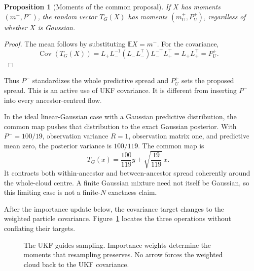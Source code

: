 \documentclass[11pt,a4paper]{article}
\newcommand{\E}{\mathbb E}
\newcommand{\Cov}{\operatorname{Cov}}
\newtheorem{proposition}{Proposition}[section]
\begin{document}
\begin{proposition}[Moments of the common proposal]
If \(X\) has moments \((m^-,P^-)\), the random vector \(T_G(X)\) has
moments \((m_U^+,P_U^+)\), regardless of whether \(X\) is Gaussian.
\end{proposition}
\begin{proof}
The mean follows by substituting \(\E X=m^-\). For the covariance,
\begin{equation}
\label{eq:global-covariance}
 \Cov(T_G(X))
 =L_+L_-^{-1}(L_-L_-^\top)L_-^{-\top}L_+^\top
 =L_+L_+^\top=P_U^+ .
\end{equation}
\end{proof}

Thus \(P^-\) standardizes the whole predictive spread and \(P_U^+\)
sets the proposed spread. This is an active use of UKF covariance.
It is different from inserting \(P^-\) into every ancestor-centred flow.

In the ideal linear-Gaussian case with a Gaussian predictive distribution,
the common map pushes that distribution to the exact Gaussian posterior.
With \(P^-=100/19\), observation variance \(R=1\), observation matrix one,
and predictive mean zero, the posterior variance is \(100/119\).
The common map is
\[
 T_G(x)=\frac{100}{119}y+\sqrt{\frac{19}{119}}\,x.
\]
It contracts both within-ancestor and between-ancestor spread coherently
around the whole-cloud centre. A finite Gaussian mixture need not itself
be Gaussian, so this limiting case is not a finite-\(N\) exactness claim.

After the importance update below, the covariance target changes to the
weighted particle covariance. Figure~\ref{fig:covariance-roles} locates
the three operations without conflating their targets.
\begin{figure}[htbp]
\centering
{}
\caption{The UKF guides sampling. Importance weights determine the moments
that resampling preserves. No arrow forces the weighted cloud back to
the UKF covariance.}
\label{fig:covariance-roles}
\end{figure}
\end{document}
